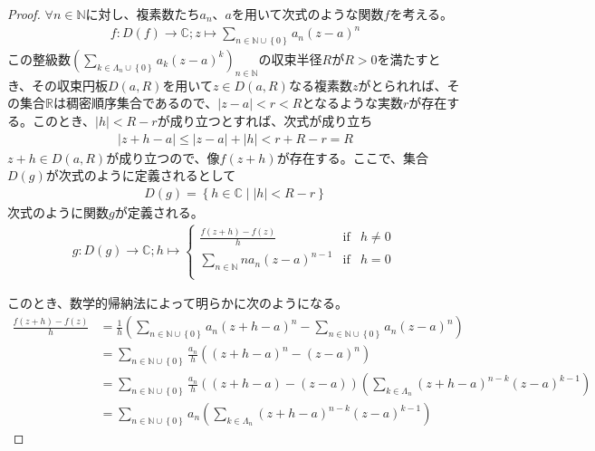 \documentclass[dvipdfmx]{jsarticle}
\begin{document}
\begin{proof}
$\forall n \in \mathbb{N}$に対し、複素数たち$a_{n}$、$a$を用いて次式のような関数$f$を考える。
\begin{align*}
f:D(f) \rightarrow \mathbb{C};z \mapsto \sum_{n \in \mathbb{N} \cup \left\{ 0 \right\}} {a_{n}(z - a)^{n}}
\end{align*}
この整級数$\left( \sum_{k \in \varLambda_{n} \cup \left\{ 0 \right\}} {a_{k}(z - a)^{k}} \right)_{n \in \mathbb{N}}$の収束半径$R$が$R > 0$を満たすとき、その収束円板$D(a,R)$を用いて$z \in D(a,R)$なる複素数$z$がとられれば、その集合$\mathbb{R}$は稠密順序集合であるので、$|z - a| < r < R$となるような実数$r$が存在する。このとき、$|h| < R - r$が成り立つとすれば、次式が成り立ち
\begin{align*}
|z + h - a| \leq |z - a| + |h| < r + R - r = R
\end{align*}
$z + h \in D(a,R)$が成り立つので、像$f(z + h)$が存在する。ここで、集合$D(g)$が次式のように定義されるとして
\begin{align*}
D(g) = \left\{ h \in \mathbb{C} \middle| |h| < R - r \right\}
\end{align*}
次式のように関数$g$が定義される。
\begin{align*}
g:D(g) \rightarrow \mathbb{C};h \mapsto \left\{ \begin{matrix}
\frac{f(z + h) - f(z)}{h} & \mathrm{if} & h \neq 0 \\
\sum_{n \in \mathbb{N}} {na_{n}(z - a)^{n - 1}} & \mathrm{if} & h = 0 \\
\end{matrix} \right.\ 
\end{align*}\par
このとき、数学的帰納法によって明らかに次のようになる。
\begin{align*}
\frac{f(z + h) - f(z)}{h} &= \frac{1}{h}\left( \sum_{n \in \mathbb{N} \cup \left\{ 0 \right\}} {a_{n}(z + h - a)^{n}} - \sum_{n \in \mathbb{N} \cup \left\{ 0 \right\}} {a_{n}(z - a)^{n}} \right)\\
&= \sum_{n \in \mathbb{N} \cup \left\{ 0 \right\}} {\frac{a_{n}}{h}\left( (z + h - a)^{n} - (z - a)^{n} \right)}\\
&= \sum_{n \in \mathbb{N} \cup \left\{ 0 \right\}} {\frac{a_{n}}{h}\left( (z + h - a) - (z - a) \right)\left( \sum_{k \in \varLambda_{n}} {(z + h - a)^{n - k}(z - a)^{k - 1}} \right)}\\
&= \sum_{n \in \mathbb{N} \cup \left\{ 0 \right\}} {a_{n}\left( \sum_{k \in \varLambda_{n}} {(z + h - a)^{n - k}(z - a)^{k - 1}} \right)}
\end{align*}

\end{proof}
\end{document}
